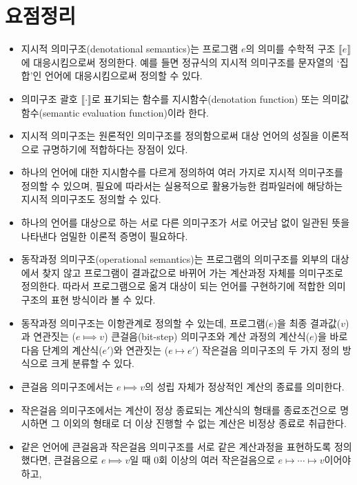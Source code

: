 \section*{요점정리}
\begin{itemize}
 \item 지시적 의미구조(denotational semantics)는 프로그램 $e$의 의미를
       수학적 구조 $\llbracket e\rrbracket$에 대응시킴으로써 정의한다.
       예를 들면 정규식의 지시적 의미구조를 문자열의 `집합'인 언어에
       대응시킴으로써 정의할 수 있다.
 \item 의미구조 괄호 $\llbracket \cdot \rrbracket$로 표기되는
       함수를 지시함수(denotation function) 또는
       의미값함수(semantic evaluation function)이라 한다.
 \item 지시적 의미구조는 원론적인 의미구조를 정의함으로써 대상 언어의
       성질을 이론적으로 규명하기에 적합하다는 장점이 있다.
 \item 하나의 언어에 대한 지시함수를 다르게 정의하여 여러 가지로
       지시적 의미구조를 정의할 수 있으며, 필요에 따라서는 실용적으로
       활용가능한 컴파일러에 해당하는 지시적 의미구조도 정의할 수 있다.
 \item 하나의 언어를 대상으로 하는 서로 다른 의미구조가 서로 어긋남
       없이 일관된 뜻을 나타낸다 엄밀한 이론적 증명이 필요하다.
 \item 동작과정 의미구조(operational semantics)는 프로그램의 의미구조를
       외부의 대상에서 찾지 않고 프로그램이 결과값으로 바뀌어 가는
       계산과정 자체를 의미구조로 정의한다. 따라서 프로그램으로 옮겨
       대상이 되는 언어를 구현하기에 적합한 의미구조의 표현 방식이라 볼 수 있다.
 \item 동작과정 의미구조는 이항관계로 정의할 수 있는데,
       프로그램($e$)을 최종 결과값($v$)과 연관짓는 ($e\Longmapsto v$)
       큰걸음(bit-step) 의미구조와 계산 과정의 계산식($e$)을 바로
       다음 단계의 계산식($e'$)와 연관짓는 ($e\longmapsto e'$)
       작은걸음 의미구조의 두 가지 정의 방식으로 크게 분류할 수 있다.
 \item 큰걸음 의미구조에서는 $e\Longmapsto v$의 성립 자체가 정상적인
       계산의 종료를 의미한다.
 \item 작은걸음 의미구조에서는 계산이 정상 종료되는 계산식의 형태를
       종료조건으로 명시하면 그 이외의 형태로 더 이상 진행할 수 없는
       계산은 비정상 종료로 취급한다.
 \item 같은 언어에 큰걸음과 작은걸음 의미구조를 서로 같은 계산과정을
       표현하도록 정의했다면, 큰걸음으로 $e\Longmapsto v$일 때
       0회 이상의 여러 작은걸음으로 $e\longmapsto \cdots \longmapsto v$이어야 하고,

\end{itemize}
